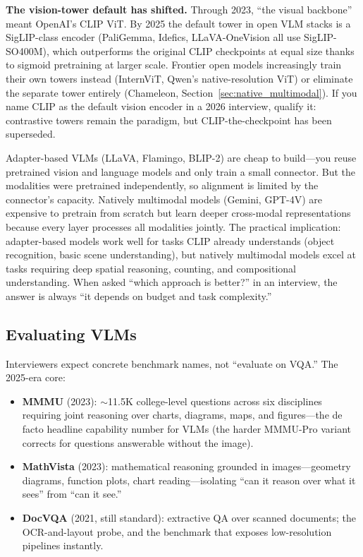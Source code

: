 \textbf{The vision-tower default has shifted.} Through 2023, ``the visual backbone'' meant OpenAI's CLIP ViT. By 2025 the default tower in open VLM stacks is a SigLIP-class encoder (PaliGemma, Idefics, LLaVA-OneVision all use SigLIP-SO400M), which outperforms the original CLIP checkpoints at equal size thanks to sigmoid pretraining at larger scale. Frontier open models increasingly train their own towers instead (InternViT, Qwen's native-resolution ViT) or eliminate the separate tower entirely (Chameleon, Section~\ref{sec:native_multimodal}). If you name CLIP as the default vision encoder in a 2026 interview, qualify it: contrastive towers remain the paradigm, but CLIP-the-checkpoint has been superseded.

\begin{keyinsight}
Adapter-based VLMs (LLaVA, Flamingo, BLIP-2) are cheap to build---you reuse pretrained vision and language models and only train a small connector. But the modalities were pretrained independently, so alignment is limited by the connector's capacity. Natively multimodal models (Gemini, GPT-4V) are expensive to pretrain from scratch but learn deeper cross-modal representations because every layer processes all modalities jointly. The practical implication: adapter-based models work well for tasks CLIP already understands (object recognition, basic scene understanding), but natively multimodal models excel at tasks requiring deep spatial reasoning, counting, and compositional understanding. When asked ``which approach is better?'' in an interview, the answer is always ``it depends on budget and task complexity.''
\end{keyinsight}

\subsection{Evaluating VLMs}
\label{subsec:evaluating_vlms}

Interviewers expect concrete benchmark names, not ``evaluate on VQA.'' The 2025-era core:

\begin{itemize}
    \item \textbf{MMMU} (2023): $\sim$11.5K college-level questions across six disciplines requiring joint reasoning over charts, diagrams, maps, and figures---the de facto headline capability number for VLMs (the harder MMMU-Pro variant corrects for questions answerable without the image).
    \item \textbf{MathVista} (2023): mathematical reasoning grounded in images---geometry diagrams, function plots, chart reading---isolating ``can it reason over what it sees'' from ``can it see.''
    \item \textbf{DocVQA} (2021, still standard): extractive QA over scanned documents; the OCR-and-layout probe, and the benchmark that exposes low-resolution pipelines instantly.
\end{itemize}

